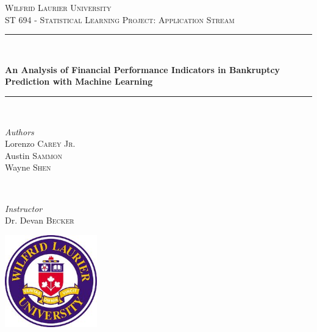 \documentclass[12pt]{report}
\begin{document}
\begin{titlepage} 
	\newcommand{\HRule}{\rule{\linewidth}{0.5mm}} 
	\center 
	
	\textsc{\LARGE Wilfrid Laurier University}\\[1.5cm] %
	
	\textsc{\Large ST 694 - Statistical Learning Project: Application Stream}\\[0.5cm] %
	
	\HRule\\[0.4cm]
	{\large\bfseries An Analysis of Financial Performance Indicators in Bankruptcy Prediction with Machine Learning
	
	\HRule\\[1.5cm]
	\begin{minipage}{0.4\textwidth}
		\begin{flushleft}
			\large
			\textit{Authors}\\
                Lorenzo \textsc{Carey Jr.} \\
                Austin \textsc{Sammon}\\
			Wayne \textsc{Shen}\\
		\end{flushleft}
	\end{minipage}
	~
	\begin{minipage}{0.4\textwidth}
		\begin{flushright}
			\large
			\textit{Instructor}\\
			Dr. Devan \textsc{Becker} %
		\end{flushright}
	\end{minipage}
	\vfill\vfill\vfill
	
	\vfill\vfill\vfill
	\includegraphics[width=0.3\textwidth]{Wlu_colour_logo.jpg}\\[0.1cm] 
	
	\vfill
	}
\end{titlepage}


\end{document}
